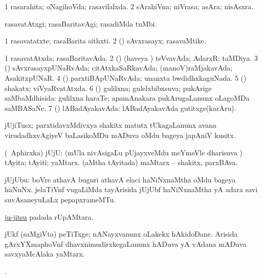 \bentry
{}
\gl{\gu}
\bmng
\bnum
\num{1} rasarahita; oNagihoVda; rasavilalxda. 
\num{2} sArahiVna; niVrasa; asAra; nisAsxra. 
\enum
\emng
\eentry

\bentry
{}
\gl{\kirxvi}
\bmng
rasavatAtxgi; rasaBaritavAgi; rasadiMda tuMbi. 
\emng
\eentry

\bentry
{}
\gl{\nA}
\bmng
\bnum
\num{1} rasavatatxte; rasaBarita sithxti. 
\num{2} (\rUpa) sAvxrasayx; rasavaMtike. 
\enum
\emng
\eentry

\bentry
{}
\gl{\gu}
\bmng
\bnum
\num{1} rasavatAtxda; rasaBaritavAda. 
\num{2} (\AmA) (haveya \vi) teVvavAda; AdarxR; taMDiya. 
\num{3} (\AmA) sAvxrasayxpUNaRvAda; citAtxkaSaRkavAda; (manoV)raMjakavAda; AsakitxpUNaR. 
\num{4} (\AmA) parxtiBApUNaRvAda; unanxta bwdidhxkaguNada. 
\num{5} (\AmA) shakatx; viVyaRvatAtxda. 
\num{6} (\AmA) gulilxna; gulelxbibxsuva; pukArige saMbaMdhisida:  gulilxna haraTe; apamAnakara pukArugaLanunx oLagoMDa saMBASaNe. 
\num{7} (\AmA) lABadAyakavAda:  lABadAyakavAda gutitxge(karAru). 
\enum
\emng
\eentry

\bentry
{}
\gl{\nA}
\bmng
jUjiTusx; parxtidavxMdivxya shakitx matutx tUkagaLanunx avana virudadhxvAgiyeV baLasikoMDu mADuva oMdu bageya japAniV kusitx. 
\emng
\eentry

\bentry
{}
\gl{\nA}
\bmng
(\pa\ Aphirxka) jUjU: 
\banum
{} (mUla nivAsigaLu pUjayxveMdu meYmeVle dharisuva ) tAyita; tAyiti; yaMtarx. 
 (aMtha tAyitada) maMtarx -- shakitx, parxBAva. 
\eanum
\emng
\eentry

\bentry
{}
\gl{\nA}
\bmng
jUjUbu: 
\banum
{} boVre athavA buguri athavA elaci haNiNxnaMtha oMdu bageya haNuNx. 
 jelaTiVnf \mo vugaLiMda tayArisida jUjUbf haNiNxnaMtha yA adara savi suvAsaneyuLaLx pepapxrameMTu. 
\eanum
\emng
\eentry

\bentry
{}
\gl{\nA}
\bmng
\hyperlink{ju-jitsu}{ju-jitsu} padada rUpAMtara. 
\emng
\eentry

\bentry
{}
\gl{\nA}
\bmng
jUkf (saMgiVta) peTiTxge; nANayxvanunx oLakekx hAkidoDane. Arisida gArxYXmaphoVnf dhavxnimudirxkegaLanunx hADuva yA vAdana mADuva savxyaMcAlaka yaMtarx. 
\emng
\eentry

\bentry
{}
\gl{\saMkiSx}
\bmng
{}. 
\emng
\eentry

